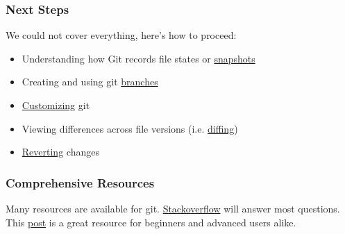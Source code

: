 \begin{frame}[t]\frametitle{Next Steps}
	We could not cover everything, here's how to proceed:

	\begin{itemize}
		\item Understanding how Git records file states or
		\href{http://git-scm.com/book/en/Getting-Started-Git-Basics}{snapshots}
		\item Creating and using git 
		\href{http://git-scm.com/book/en/Git-Branching-What-a-Branch-Is}{branches}
		\item \href{http://git-scm.com/book/en/Getting-Started-First-Time-Git-Setup}{Customizing} git
		\item Viewing differences across file versions 
		(i.e. \href{http://git-scm.com/book/en/Git-Basics-Recording-Changes-to-the-Repository}{diffing})
		\item \href{http://git-scm.com/book/en/Git-Basics-Undoing-Things}{Reverting} changes
	\end{itemize}
\end{frame}

\begin{frame}\frametitle{Comprehensive Resources}
    Many resources are available for git. 
    \href{http://stackoverflow.com/questions/tagged/git}{Stackoverflow} 
    will answer most questions. This 
    \href{http://stackoverflow.com/questions/315911/git-for-beginners-the-definitive-practical-guide}{post} is a great resource for beginners and advanced users alike.
\end{frame}

